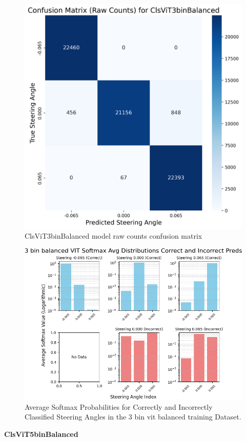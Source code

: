 \begin{figure}[H]
\centering
\includegraphics[width=0.65\linewidth]{Figures/Results/cm_raw_ClsViT3binBalanced.png}
\caption{ClsViT3binBalanced model raw counts confusion matrix}
\label{fig:cm_raw_ClsViT3binBalanced}
\end{figure}

\begin{figure}[H]
    \centering
    \includegraphics[width=1\linewidth]{Figures/Results/3_bins_vit_softmax_dist_plot_balanced.png}
    \caption{Average Softmax Probabilities for Correctly and Incorrectly Classified Steering Angles in the 3 bin vit balanced training Dataset.}
    \label{fig:3_bins_vit_softmax_dist_balanced}
\end{figure}


\textbf{ClsViT5binBalanced}


